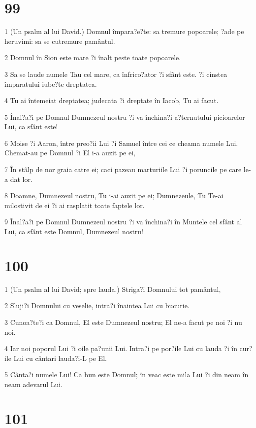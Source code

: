 \chapter{99}

\par 1 (Un psalm al lui David.) Domnul împara?e?te: sa tremure popoarele; ?ade pe heruvimi: sa se cutremure pamântul.
\par 2 Domnul în Sion este mare ?i înalt peste toate popoarele.
\par 3 Sa se laude numele Tau cel mare, ca înfrico?ator ?i sfânt este. ?i cinstea împaratului iube?te dreptatea.
\par 4 Tu ai întemeiat dreptatea; judecata ?i dreptate în Iacob, Tu ai facut.
\par 5 Înal?a?i pe Domnul Dumnezeul nostru ?i va închina?i a?ternutului picioarelor Lui, ca sfânt este!
\par 6 Moise ?i Aaron, între preo?ii Lui ?i Samuel între cei ce cheama numele Lui. Chemat-au pe Domnul ?i El i-a auzit pe ei,
\par 7 În stâlp de nor graia catre ei; caci pazeau marturiile Lui ?i poruncile pe care le-a dat lor.
\par 8 Doamne, Dumnezeul nostru, Tu i-ai auzit pe ei; Dumnezeule, Tu Te-ai milostivit de ei ?i ai rasplatit toate faptele lor.
\par 9 Înal?a?i pe Domnul Dumnezeul nostru ?i va închina?i în Muntele cel sfânt al Lui, ca sfânt este Domnul, Dumnezeul nostru!

\chapter{100}

\par 1 (Un psalm al lui David; spre lauda.) Striga?i Domnului tot pamântul,
\par 2 Sluji?i Domnului cu veselie, intra?i înaintea Lui cu bucurie.
\par 3 Cunoa?te?i ca Domnul, El este Dumnezeul nostru; El ne-a facut pe noi ?i nu noi.
\par 4 Iar noi poporul Lui ?i oile pa?unii Lui. Intra?i pe por?ile Lui cu lauda ?i în cur?ile Lui cu cântari lauda?i-L pe El.
\par 5 Cânta?i numele Lui! Ca bun este Domnul; în veac este mila Lui ?i din neam în neam adevarul Lui.

\chapter{101}

